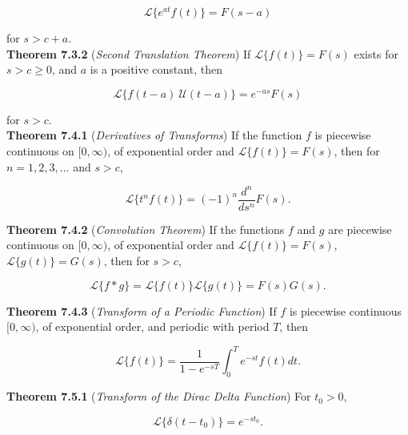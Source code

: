 \documentclass[12pt]{article}
\begin{document}
\begin{equation}
    \mathcal{L} \{e^{at} f(t)\} = F(s-a)
\end{equation}

\noindent for \(s > c + a\).\\

\noindent\textbf{Theorem 7.3.2} (\emph{Second Translation Theorem}) If \(\mathcal{L} \{f(t)\} = F(s)\) exists for \(s > c \geq 0\), and \(a\) is a positive constant, then

\begin{equation}
    \mathcal{L} \{f(t-a)\ \mathcal{U}(t-a)\} = e^{-as}F(s)
\end{equation}

\noindent for \(s > c\).\\

\noindent\textbf{Theorem 7.4.1} (\emph{Derivatives of Transforms}) If the function \(f\) is piecewise continuous on \([0,\infty)\), of exponential order and \(\mathcal{L} \{f(t)\} = F(s)\), then for \(n = 1, 2, 3, \ldots\) and \(s > c\),

\begin{equation}
    \mathcal{L} \{t^n f(t)\} = (-1)^n\frac{d^n}{ds^n} F(s).
\end{equation}

\noindent\textbf{Theorem 7.4.2} (\emph{Convolution Theorem}) If the functions \(f\) and \(g\) are piecewise continuous on \([0,\infty)\), of exponential order and \(\mathcal{L} \{f(t)\} = F(s)\), \(\mathcal{L} \{g(t)\} = G(s)\), then for \(s > c\),

\begin{equation}
    \mathcal{L} \{f*g\} = \mathcal{L} \{f(t)\} \mathcal{L} \{g(t)\} = F(s)G(s).
\end{equation}

\noindent\textbf{Theorem 7.4.3} (\emph{Transform of a Periodic Function}) If \(f\) is piecewise continuous \([0,\infty)\), of exponential order, and periodic with period \(T\), then

\begin{equation}
    \mathcal{L} \{f(t)\} = \frac{1}{1-e^{-sT}} \int_0^T e^{-st} f(t) dt.
\end{equation}

\noindent\textbf{Theorem 7.5.1} (\emph{Transform of the Dirac Delta Function}) For \(t_0 > 0\),

\begin{equation}
    \mathcal{L} \{\delta(t - t_0)\} = e^{-st_0}.
\end{equation}
\end{document}
